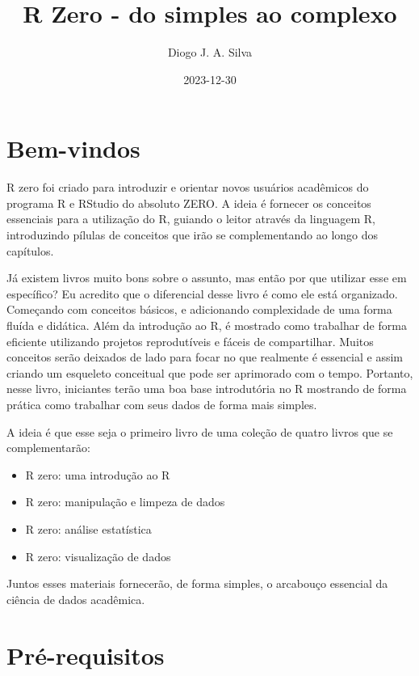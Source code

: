 \documentclass[
]{book}
\title{R Zero - do simples ao complexo}
\author{Diogo J. A. Silva}
\date{2023-12-30}
\providecommand{\tightlist}{%
  \setlength{\itemsep}{0pt}\setlength{\parskip}{0pt}}
\begin{document}
\maketitle

{
\setcounter{tocdepth}{1}
\tableofcontents
}
\hypertarget{bem-vindos}{%
\chapter{Bem-vindos}\label{bem-vindos}}

R zero foi criado para introduzir e orientar novos usuários acadêmicos do programa R e RStudio do absoluto ZERO. A ideia é fornecer os conceitos essenciais para a utilização do R, guiando o leitor através da linguagem R, introduzindo pílulas de conceitos que irão se complementando ao longo dos capítulos.

Já existem livros muito bons sobre o assunto, mas então por que utilizar esse em específico? Eu acredito que o diferencial desse livro é como ele está organizado. Começando com conceitos básicos, e adicionando complexidade de uma forma fluída e didática. Além da introdução ao R, é mostrado como trabalhar de forma eficiente utilizando projetos reprodutíveis e fáceis de compartilhar. Muitos conceitos serão deixados de lado para focar no que realmente é essencial e assim criando um esqueleto conceitual que pode ser aprimorado com o tempo. Portanto, nesse livro, iniciantes terão uma boa base introdutória no R mostrando de forma prática como trabalhar com seus dados de forma mais simples.

A ideia é que esse seja o primeiro livro de uma coleção de quatro livros que se complementarão:

\begin{itemize}
\tightlist
\item
  R zero: uma introdução ao R
\item
  R zero: manipulação e limpeza de dados
\item
  R zero: análise estatística
\item
  R zero: visualização de dados
\end{itemize}

Juntos esses materiais fornecerão, de forma simples, o arcabouço essencial da ciência de dados acadêmica.

\hypertarget{pruxe9-requisitos}{%
\chapter{Pré-requisitos}\label{pruxe9-requisitos}}
\end{document}
